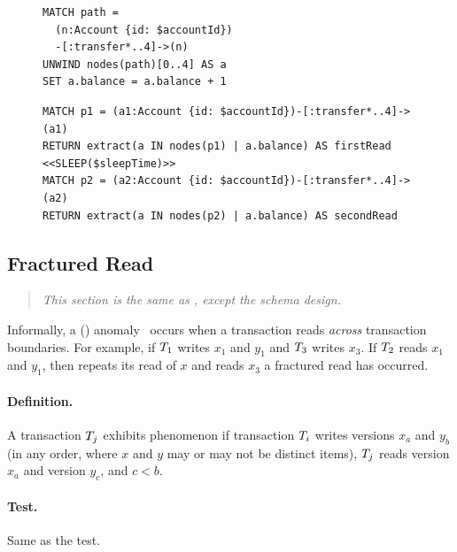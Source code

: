 \begin{figure}[htb]
\centering
\begin{minipage}{0.33\linewidth}
\begin{lstlisting}[language=cypher,label=fig:otvfr1,caption=\tx{OTV/FR $T_\mathrm{W}$}.]
MATCH path = 
  (n:Account {id: $accountId})
  -[:transfer*..4]->(n)
UNWIND nodes(path)[0..4] AS a
SET a.balance = a.balance + 1
\end{lstlisting}
\end{minipage}
\quad
\begin{minipage}{0.60\linewidth}
\begin{lstlisting}[language=cypher,label=fig:otvfr2,caption=\tx{OTV/FR $T_\mathrm{R}$}.]
MATCH p1 = (a1:Account {id: $accountId})-[:transfer*..4]->(a1)
RETURN extract(a IN nodes(p1) | a.balance) AS firstRead
<<SLEEP($sleepTime)>>
MATCH p2 = (a2:Account {id: $accountId})-[:transfer*..4]->(a2)
RETURN extract(a IN nodes(p2) | a.balance) AS secondRead
\end{lstlisting}
\end{minipage}
\end{figure}


\subsection{Fractured Read}
\label{sec:fractured-reads}

\begin{quote}
  \textit{This section is the same as \ldbcsnb, except the schema design.}
\end{quote}

Informally, a  () 
anomaly~\cite{DBLP:journals/tods/BailisFGHS16} occurs when a transaction reads 
\emph{across} transaction boundaries. For example, if $T_1$ writes $x_1$ 
and $y_1$ and $T_3$ writes $x_3$. If $T_2$ reads $x_1$ and $y_1$, then 
repeats its read of $x$ and reads $x_3$ a fractured read has occurred.

\paragraph{Definition.}
A transaction $T_j$ exhibits phenomenon  if transaction 
$T_i$ writes versions $x_a$ and $y_b$ (in any order, where $x$ and $y$ may 
or may not be distinct items), $T_j$ reads version $x_a$ and version $y_c$, 
and $c < b$.

\paragraph{Test.}
Same as the  test.

